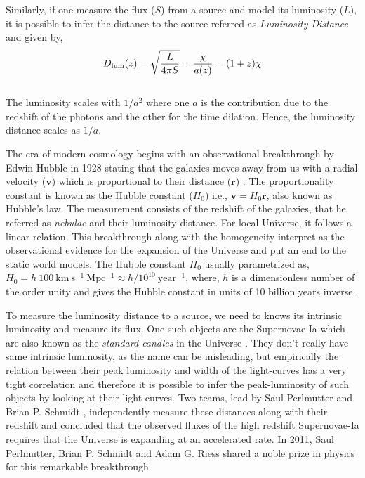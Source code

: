 Similarly, if one measure the flux ($S$) from a source and model its luminosity ($L$), it is
possible to infer the distance to the source referred as {\it Luminosity Distance} and 
given by,
\begin{equation}
	D_{\rm lum}(z) = \sqrt{\dfrac{L}{4\pi S}} = \dfrac{\chi}{a(z)} = (1+z)\chi
\end{equation}
\\
The luminosity scales with $1/a^2$ where one $a$ is the contribution due to the redshift of
the photons and the other for the time dilation. Hence, the luminosity distance scales
as $1/a$.

The era of modern cosmology begins with an observational breakthrough by Edwin Hubble 
in 1928 stating that the galaxies moves away from us with a radial velocity ($\mathbf{v}$) which
is proportional to their distance ($\mathbf{r}$) \citep{1929PNAS...15..168H}. 
The proportionality constant is known
as the Hubble constant ($H_0$) i.e., $\mathbf{v}=H_0 \mathbf{r}$, also known as Hubble's law. 
The measurement consists of the redshift of the galaxies, that he referred as
{\it nebulae} and their luminosity distance. For local Universe, it follows
a linear relation. 
This breakthrough along with the
homogeneity interpret as the observational evidence for the expansion of the Universe and
put an end to the static world models. The Hubble constant $H_0$ usually parametrized as, 
$H_0 = h\ 100\ \mathrm{km\ s^{-1}\ Mpc^{-1}} \approx h/10^{10}\ \mathrm{year^{-1}}$,
where, $h$ is a dimensionless number of the order unity and gives the 
Hubble constant in units of 10 billion years inverse. 

To measure the luminosity distance to a source, we need to 
knows its intrinsic luminosity and measure its flux. One such objects are the
Supernovae-Ia which are also known as the {\it standard candles} in the Universe
\citep{1993ApJ...405L...5B,2007AIPC..924..330D}. They
don't really have same intrinsic luminosity, as the name can be misleading, but 
empirically the relation between their peak luminosity and width of the light-curves
has a very tight correlation and therefore it is possible to infer the peak-luminosity
of such objects by looking at their light-curves. Two teams, lead by Saul Perlmutter
\citep{1999ApJ...517..565P} and
Brian P. Schmidt \citep{1998ApJ...507...46S}, 
independently measure these distances along with their redshift and
concluded that the observed fluxes of the high redshift Supernovae-Ia requires that
the Universe is expanding at an accelerated rate. In 2011, Saul Perlmutter, 
Brian P. Schmidt and Adam G. Riess
shared a noble prize in physics for this remarkable breakthrough. 




